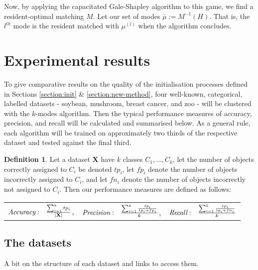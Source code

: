 \documentclass{article}
\theoremstyle{definition}
\newtheorem{definition}{Definition}[section]
\begin{document}
Now, by applying the capacitated Gale-Shapley algorithm to this game, we find a 
resident-optimal matching \(M\). Let our set of modes \(\bar{\mu} := 
M^{-1}(H)\). That is, the \(l^{th}\) mode is the resident matched with
\(\mu^{(l)}\) when the algorithm concludes.



\section{Experimental results}\label{section:results}

To give comparative results on the quality of the initialisation processes defined in Sections \ref{section:init} \& \ref{section:new-method}, four well-known, categorical, labelled datasets - soybean, mushroom, breast cancer, and zoo - will be clustered with the $k$-modes algorithm. Then the typical performance measures of accuracy, precision, and recall will be calculated and summarised below. As a general rule, each algorithm will be trained on approximately two thirds of the respective dataset and tested against the final third.

\begin{definition}
	Let a dataset \textbf{X} have $k$ classes $C_1, \ldots, C_k$, let the number of objects correctly assigned to $C_i$ be denoted $tp_i$, let $fp_i$ denote the number of objects incorrectly assigned to $C_i$, and let $fn_i$ denote the number of objects incorrectly not assigned to $C_i$. Then our performance measures are defined as follows: \\
		
		\centering
		\begin{tabular}{ccc}
			$\emph{Accuracy}: \ \ \frac{\sum_{i=1}^{k}{tp_i}}{|\textbf{X}|}$, &
			
			$\emph{Precision}: \ \ \frac{\sum_{i=1}^{k} \frac{tp_i}{tp_i + fp_i}}{k}$, &
			
			$\emph{Recall}: \ \ \frac{\sum_{i=1}^{k} \frac{tp_i}{tp_i + fn_i}}{k}$ \\
		\end{tabular}
\end{definition}


\subsection{The datasets}\label{subsection:datasets}

A bit on the structure of each dataset and links to access them.
\end{document}
